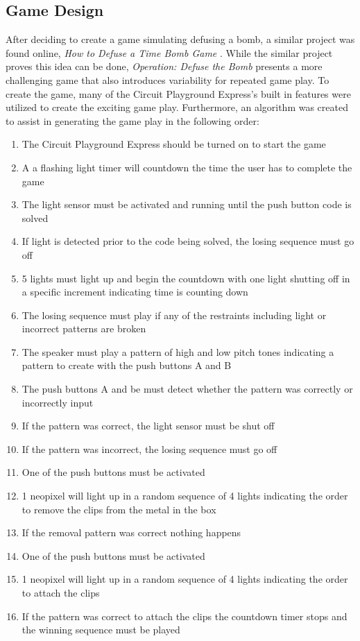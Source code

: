 \documentclass[12pt]{article}
\begin{document}
\subsection{Game Design}
After deciding to create a game simulating defusing a bomb, a similar project was found online, \textit{How to Defuse a Time Bomb Game} \cite{instructables-circuits}.  While the similar project proves this idea can be done, \textit{Operation: Defuse the Bomb} presents a more challenging game that also introduces variability for repeated game play.  To create the game, many of the Circuit Playground Express's built in features were utilized to create the exciting game play. Furthermore, an algorithm was created to assist in generating the game play in the following order:
\begin{enumerate}
    \item The Circuit Playground Express should be turned on to start the game
    \item A a flashing light timer will countdown the time the user has to complete the game
    \item The light sensor must be activated and running until the push button code is solved
    \item If light is detected prior to the code being solved, the losing sequence must go off
    \item 5 lights must light up and begin the countdown with one light shutting off in a specific increment indicating time is counting down
    \item The losing sequence must play if any of the restraints including light or incorrect patterns are broken
    \item The speaker must play a pattern of high and low pitch tones indicating a pattern to create with the push buttons A and B
    \item The push buttons A and be must detect whether the pattern was correctly or incorrectly input
    \item If the pattern was correct, the light sensor must be shut off
    \item If the pattern was incorrect, the losing sequence must go off
    \item One of the push buttons must be activated
    \item 1 neopixel will light up in a random sequence of 4 lights indicating the order to remove the clips from the metal in the box
    \item If the removal pattern was correct nothing happens
    \item One of the push buttons must be activated
    \item 1 neopixel will light up in a random sequence of 4 lights indicating the order to attach the clips
    \item If the pattern was correct to attach the clips the countdown timer stops and the winning sequence must be played

\end{enumerate}
\end{document}

